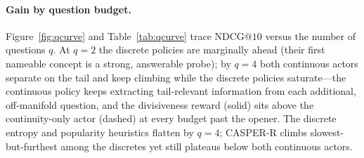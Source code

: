 \documentclass[11pt]{article}
\begin{document}
\paragraph{Gain by question budget.} Figure~\ref{fig:qcurve} and Table~\ref{tab:qcurve} trace $\mathrm{NDCG@10}$ versus
the number of questions $q$. At $q{=}2$ the discrete policies are marginally ahead (their first nameable concept is a
strong, answerable probe); by $q{=}4$ both continuous actors separate on the tail and keep climbing while the discrete
policies saturate---the continuous policy keeps extracting tail-relevant information from each additional, off-manifold
question, and the divisiveness reward (solid) sits above the continuity-only actor (dashed) at every budget past the
opener. The discrete entropy and popularity heuristics flatten by $q{=}4$; CASPER-R climbs slowest-but-furthest among the
discretes yet still plateaus below both continuous actors.
\end{document}
